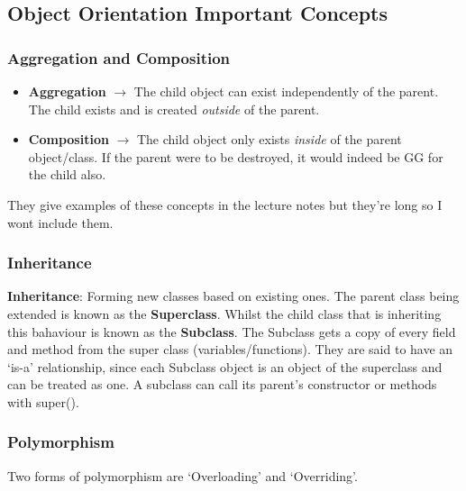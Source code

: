 \documentclass{article}
\begin{document}
\subsection{Object Orientation Important Concepts}
\subsubsection{Aggregation and Composition}
\begin{itemize}
\item \textbf{Aggregation} $\longrightarrow$ The child object can exist independently of the parent. The child exists and is created \emph{outside} of the parent.
\item \textbf{Composition} $\longrightarrow$ The child object only exists \emph{inside} of the parent object/class. If the parent were to be destroyed, it would indeed be GG for the child also.
\end{itemize}

They give examples of these concepts in the lecture notes but they're long so I wont include them.

\subsubsection{Inheritance}
\textbf{Inheritance}: Forming new classes based on existing ones. The parent class being extended is known as the \textbf{Superclass}. Whilst the child class that is inheriting this bahaviour is known as the \textbf{Subclass}.  The Subclass gets a copy of every field and method from the super class (variables/functions). They are said to have an `is-a' relationship, since each Subclass object is an object of the superclass and can be treated as one. A subclass can call its parent's constructor or methods with super().

\subsubsection{Polymorphism}
Two forms of polymorphism are `Overloading' and `Overriding'.
\end{document}
